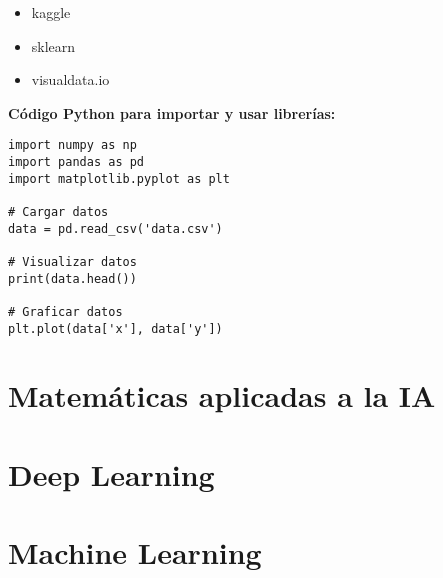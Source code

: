 \documentclass{templateNote}
\begin{document}
\begin{itemize}
    \item kaggle
    \item sklearn
    \item visualdata.io
\end{itemize}


\noindent\textbf{Código Python para importar y usar librerías:}
\begin{lstlisting}
import numpy as np
import pandas as pd
import matplotlib.pyplot as plt 

# Cargar datos
data = pd.read_csv('data.csv')

# Visualizar datos
print(data.head())

# Graficar datos
plt.plot(data['x'], data['y'])
\end{lstlisting}

\newpage
\section{Matemáticas aplicadas a la IA}

\newpage
\section{Deep Learning}

\newpage
\section{Machine Learning}
\end{document}
